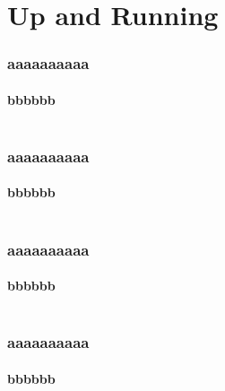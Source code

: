 \documentclass{beamer}
\begin{document}
\section{Up and Running}
\frame
{
  \frametitle{aaaaaaaaaa}
  \framesubtitle{bbbbbb}

\begin{columns}
	\begin{column}{6cm}
	
	\end{column}
\pause
	\begin{column}{6cm}
	
	\end{column}
\end{columns}

}
\frame
{
  \frametitle{aaaaaaaaaa}
  \framesubtitle{bbbbbb}

\begin{columns}
	\begin{column}{6cm}
	
	\end{column}
\pause
	\begin{column}{6cm}
	
	\end{column}
\end{columns}

}
\frame
{
  \frametitle{aaaaaaaaaa}
  \framesubtitle{bbbbbb}

\begin{columns}
	\begin{column}{6cm}
	
	\end{column}
\pause
	\begin{column}{6cm}
	
	\end{column}
\end{columns}

}
\frame
{
  \frametitle{aaaaaaaaaa}
  \framesubtitle{bbbbbb}

\begin{columns}
	\begin{column}{6cm}
	
	\end{column}
\pause
	\begin{column}{6cm}
	
	\end{column}
\end{columns}

}
\end{document}

